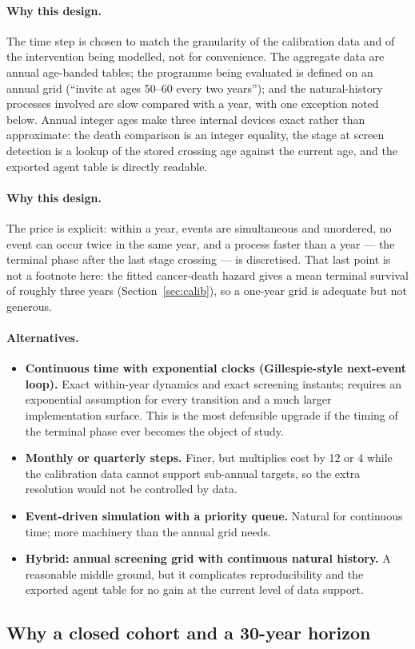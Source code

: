 \documentclass[12pt,a4paper]{article}
\newcommand{\why}[1]{\paragraph{Why this design.} #1}
\newcommand{\alt}[1]{\paragraph{Alternatives.} #1}
\begin{document}
\why{The time step is chosen to match the granularity of the calibration data and of the intervention
being modelled, not for convenience. The aggregate data are annual age-banded tables; the programme being
evaluated is defined on an annual grid (``invite at ages 50--60 every two years''); and the natural-history
processes involved are slow compared with a year, with one exception noted below. Annual integer ages make
three internal devices exact rather than approximate: the death comparison is an integer equality, the
stage at screen detection is a lookup of the stored crossing age against the current age, and the
exported agent table is directly readable.}

\why{The price is explicit: within a year, events are simultaneous and unordered, no event can occur
twice in the same year, and a process faster than a year --- the terminal phase after the last stage
crossing --- is discretised. That last point is not a footnote here: the fitted cancer-death hazard gives
a mean terminal survival of roughly three years (Section~\ref{sec:calib}), so a one-year grid is adequate
but not generous.}

\alt{\begin{itemize}[nosep]
  \item \textbf{Continuous time with exponential clocks (Gillespie-style next-event loop).} Exact
        within-year dynamics and exact screening instants; requires an exponential assumption for every
        transition and a much larger implementation surface. This is the most defensible upgrade if the
        timing of the terminal phase ever becomes the object of study.
  \item \textbf{Monthly or quarterly steps.} Finer, but multiplies cost by 12 or 4 while the calibration
        data cannot support sub-annual targets, so the extra resolution would not be controlled by data.
  \item \textbf{Event-driven simulation with a priority queue.} Natural for continuous time; more
        machinery than the annual grid needs.
  \item \textbf{Hybrid: annual screening grid with continuous natural history.} A reasonable middle
        ground, but it complicates reproducibility and the exported agent table for no gain at the
        current level of data support.
\end{itemize}}

\subsection{Why a closed cohort and a 30-year horizon}
\end{document}
